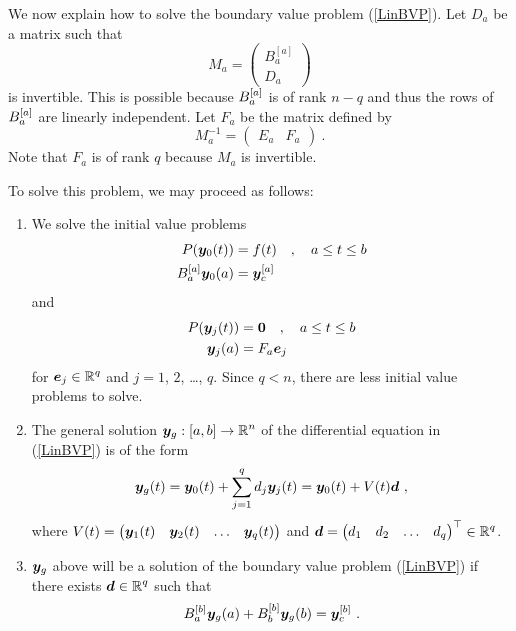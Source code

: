 We now explain how to solve the boundary value problem (\ref{LinBVP}).
Let $D_a$ be a  matrix such that
\[
M_a = \begin{pmatrix} B_a^{[a]} \\ D_a \end{pmatrix}
\]
is invertible. This is possible because $\displaystyle B_a^{[a]}$ is
of rank $n-q$ and thus the rows of $\displaystyle B_a^{[a]}$ are
linearly independent.  Let $F_a$ be the  matrix defined by 
\[
M_a^{-1} = \begin{pmatrix} E_a & F_a \end{pmatrix} \ .
\]
Note that $F_a$ is of rank $q$ because $M_a$ is invertible.

To solve this problem, we may proceed as follows:

\begin{algo}
\begin{enumerate}
\item We solve the initial value problems
\begin{align}
P(\bm{y}_0(t)) &= f(t) \quad , \quad a \leq t \leq b \nonumber \\
B_a^{[a]} \bm{y}_0(a) &= \bm{y}_{c}^{[a]} \label{FiYccond1}
\end{align}
and
\begin{align*}
P(\bm{y}_j(t)) &= \bm{0} \quad , \quad a \leq t \leq b \\
\bm{y}_j(a) &= F_a\bm{e}_j
\end{align*}
for $\displaystyle \bm{e}_j \in \mathbb{R}^q$ and $j=1$, $2$, \ldots, $q$.
Since $q < n$, there are less initial value problems to solve.
\item The general solution $\displaystyle \bm{y}_g:[a,b]\to \mathbb{R}^n$ of
the differential equation in (\ref{LinBVP}) is of the form
\[
\bm{y}_g(t) = \bm{y}_0(t) + \sum_{j=1}^q d_j \bm{y}_j(t) =
\bm{y}_0(t) + V(t) \bm{d} \ ,
\]
where
$\displaystyle V(t) = \begin{pmatrix}
\bm{y}_1(t) & \bm{y}_2(t) & \ldots & \bm{y}_q(t) \end{pmatrix}$
and $\displaystyle \bm{d} =
\begin{pmatrix} d_1 & d_2 & \ldots & d_q \end{pmatrix}^\top \in \mathbb{R}^q$.
\item $\bm{y}_g$ above will be a solution of the boundary value
problem (\ref{LinBVP}) if there exists $\displaystyle \bm{d} \in \mathbb{R}^q$
such that
\begin{equation} \label{RForm}
B_a^{[b]} \VEC{y}_g(a) + B_b^{[b]} \VEC{y}_g(b) = \VEC{y}_{c}^{[b]} \ .
\end{equation}
\end{enumerate}
\end{algo}

